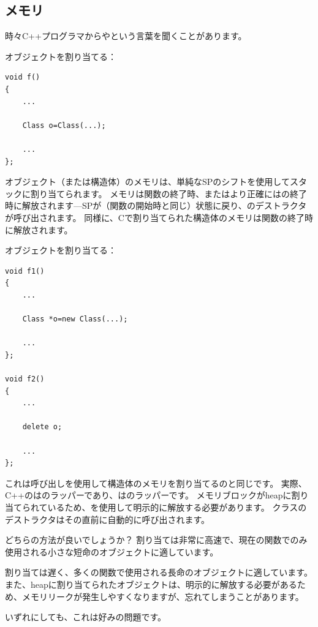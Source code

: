 \subsection{メモリ}

時々C++プログラマからやという言葉を聞くことがあります。

オブジェクトを割り当てる：

\begin{lstlisting}[style=customc]
void f()
{
	...

	Class o=Class(...);

	...
};
\end{lstlisting}

オブジェクト（または構造体）のメモリは、単純な\ac{SP}のシフトを使用してスタックに割り当てられます。
メモリは関数の終了時、またはより正確にはの終了時に解放されます---\ac{SP}が（関数の開始時と同じ）状態に戻り、のデストラクタが呼び出されます。
同様に、Cで割り当てられた構造体のメモリは関数の終了時に解放されます。

オブジェクトを割り当てる：

\begin{lstlisting}[style=customc]
void f1()
{
	...

	Class *o=new Class(...);

	...
};

void f2()
{
	...

	delete o;

	...
};
\end{lstlisting}

これは呼び出しを使用して構造体のメモリを割り当てるのと同じです。
実際、C++のはのラッパーであり、はのラッパーです。
メモリブロックが\gls{heap}に割り当てられているため、を使用して明示的に解放する必要があります。
クラスのデストラクタはその直前に自動的に呼び出されます。

どちらの方法が良いでしょうか？
割り当ては非常に高速で、現在の関数でのみ使用される小さな短命のオブジェクトに適しています。

割り当ては遅く、多くの関数で使用される長命のオブジェクトに適しています。
また、\gls{heap}に割り当てられたオブジェクトは、明示的に解放する必要があるため、メモリリークが発生しやすくなりますが、忘れてしまうことがあります。

いずれにしても、これは好みの問題です。